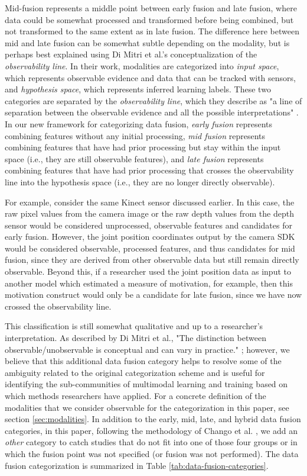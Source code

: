 \documentclass[manuscript,screen,review]{acmart}
\begin{document}
Mid-fusion represents a middle point between early fusion and late fusion, where data could be somewhat processed and transformed before being combined, but not transformed to the same extent as in late fusion. The difference here between mid and late fusion can be somewhat subtle depending on the modality, but is perhaps best explained using Di Mitri et al.’s \cite{DiMitri2018} conceptualization of the \textit{observability line}. In their work, modalities are categorized into \textit{input space}, which represents observable evidence and data that can be tracked with sensors, and \textit{hypothesis space}, which represents inferred learning labels. These two categories are separated by the \textit{observability line}, which they describe as "a line of separation between the observable evidence and all the possible interpretations" \cite{DiMitri2018}. In our new framework for categorizing data fusion, \textit{early fusion} represents combining features without any initial processing, \textit{mid fusion} represents combining features that have had prior processing but stay within the input space (i.e., they are still observable features), and \textit{late fusion} represents combining features that have had prior processing that crosses the observability line into the hypothesis space (i.e., they are no longer directly observable).

For example, consider the same Kinect sensor discussed earlier. In this case, the raw pixel values from the camera image or the raw depth values from the depth sensor would be considered unprocessed, observable features and candidates for early fusion. However, the joint position coordinates output by the camera SDK would be considered observable, processed features, and thus candidates for mid fusion, since they are derived from other observable data but still remain directly observable. Beyond this, if a researcher used the joint position data as input to another model which estimated a measure of motivation, for example, then this motivation construct would only be a candidate for late fusion, since we have now crossed the observability line. 

This classification is still somewhat qualitative and up to a researcher's interpretation. As described by Di Mitri et al., "The distinction between observable/unobservable is conceptual and can vary in practice." \cite{DiMitri2018}; however, we believe that this additional data fusion category helps to resolve some of the ambiguity related to the original categorization scheme and is useful for identifying the sub-communities of multimodal learning and training based on which methods researchers have applied. For a concrete definition of the modalities that we consider observable for the categorization in this paper, see section \ref{sec:modalities}. In addition to the early, mid, late, and hybrid data fusion categories, in this paper, following the methodology of Chango et al. \cite{Chango2022}, we add an \textit{other} category to catch studies that do not fit into one of those four groups or in which the fusion point was not specified (or fusion was not performed). The data fusion categorization is summarized in Table \ref{tab:data-fusion-categories}.
\end{document}
